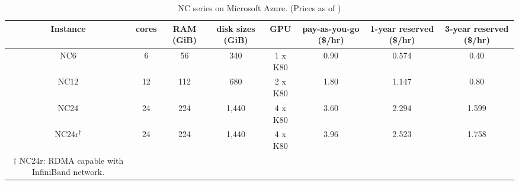 \begin{table*}
\caption{\label{tab:table}NC series on Microsoft Azure. (Prices as of )}
\begin{center}
\begin{tabular}{cccccccc}
Instance & cores & RAM (GiB) & disk sizes (GiB) & GPU & pay-as-you-go (\$/hr) & 1-year reserved (\$/hr) & 3-year reserved (\$/hr) \\
\hline
NC6 & 6 & 56 & 340 & 1 x K80 & 0.90 & 0.574 & 0.40 \\
NC12 & 12 & 112 & 680 & 2 x K80 & 1.80 & 1.147 & 0.80 \\
NC24 & 24 & 224 & 1,440 & 4 x K80 & 3.60 & 2.294 & 1.599 \\
NC24r$^\dagger$ & 24 & 224 & 1,440 & 4 x K80 & 3.96 & 2.523 & 1.758 \\
\hline
$\dagger$ NC24r: RDMA capable with InfiniBand network.
\end{tabular}
\end{center}
\end{table*}